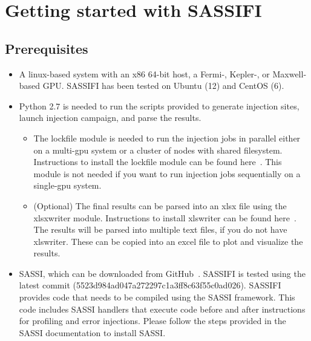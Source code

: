 \section{Getting started with SASSIFI}

\subsection{Prerequisites}

\begin{itemize}

\item A linux-based system with an x86 64-bit host, a Fermi-, Kepler-, or
Maxwell-based GPU. SASSIFI has been tested on Ubuntu (12) and CentOS (6).

\item Python 2.7 is needed to run the scripts provided to generate injection
sites, launch injection campaign, and parse the results.	

\begin{itemize}
\item The lockfile module is needed to run the injection jobs in parallel
either on a multi-gpu system or a cluster of nodes with shared filesystem. 
Instructions to install the lockfile module can be found here~\cite{lockfile}.
This module is not needed if you want to run injection jobs sequentially on a
single-gpu system. 
\item (Optional) The final results can be parsed into an xlsx file using the
xlsxwriter module. Instructions to install xlswriter can be found
here~\cite{XlsxWriter}. The results will be parsed into multiple text files, if
you do not have xlswriter.  These can be copied into an excel file to plot and
visualize the results.
\end{itemize}

\item SASSI, which can be downloaded from GitHub~\cite{SASSI}. SASSIFI is
tested using the latest commit (5523d984ad047a272297c1a3ff8c63f55c0ad026).
SASSIFI provides code  that needs to be compiled using the SASSI
framework.  This code includes SASSI handlers that execute code before and
after instructions for profiling and error injections. Please follow the steps
provided in the SASSI documentation to install SASSI. 

\end{itemize}






